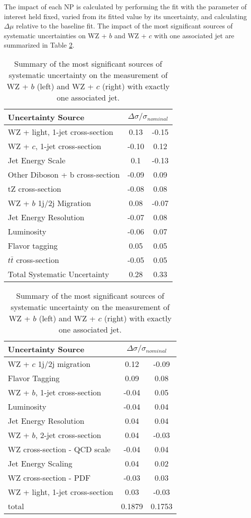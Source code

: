 The impact of each NP is calculated by performing the fit with the parameter of interest held fixed, varied from its fitted value by its uncertainty, and calculating $\Delta\mu$ relative to the baseline fit.  The impact of the most significant sources of systematic uncertainties on WZ + $b$ and WZ + $c$ with one associated jet are summarized in Table \ref{tab:systematics_1j}. 

\begin{table}[H]
    \centering
    \begin{tabular}{l|cc}
        \hline\hline
        Uncertainty Source & \multicolumn{2}{c}{$\Delta \sigma/\sigma_{nominal}$ }  \\
        \hline
        WZ + light, 1-jet cross-section & 0.13 & -0.15 \\
        WZ + $c$, 1-jet cross-section & -0.10 & 0.12 \\
        Jet Energy Scale & 0.1 & -0.13 \\
        Other Diboson + b cross-section & -0.09 & 0.09 \\
        tZ cross-section & -0.08 & 0.08 \\
        WZ + $b$ 1j/2j Migration & 0.08 & -0.07 \\
        Jet Energy Resolution & -0.07 & 0.08 \\
        Luminosity & -0.06 & 0.07 \\
        Flavor tagging & 0.05 & 0.05 \\
        $t\bar{t}$ cross-section & -0.05 & 0.05 \\
        \hline
        Total Systematic Uncertainty & 0.28 & 0.33 \\
        \hline\hline
    \end{tabular}%
    \begin{tabular}{l|cc}
        \hline\hline
        Uncertainty Source & \multicolumn{2}{c}{$\Delta \sigma/\sigma_{nominal}$ }  \\
        \hline
        WZ + $c$ 1j/2j migration & 0.12 & -0.09 \\
        Flavor Tagging & 0.09 & 0.08 \\
        WZ + $b$, 1-jet cross-section & -0.04 & 0.05 \\
        Luminosity & -0.04 & 0.04 \\
        Jet Energy Resolution & 0.04 & 0.04 \\
        WZ + $b$, 2-jet cross-section & 0.04 & -0.03 \\
        WZ cross-section - QCD scale & -0.04 & 0.04 \\
        Jet Energy Scaling & 0.04 & 0.02 \\
        WZ cross-section - PDF & -0.03 & 0.03 \\
        WZ + light, 1-jet cross-section & 0.03 & -0.03 \\
        \hline
        total & 0.1879 & 0.1753 \\
        \hline\hline
    \end{tabular}  
    \caption{Summary of the most significant sources of systematic uncertainty on the measurement of WZ + $b$ (left) and WZ + $c$ (right) with exactly one associated jet.}
    \label{tab:systematics_1j}
\end{table}

